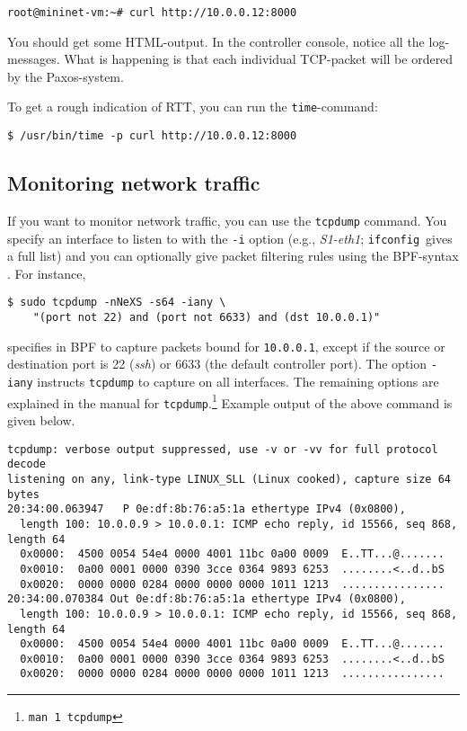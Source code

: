 \begin{Verbatim}
root@mininet-vm:~# curl http://10.0.0.12:8000
\end{Verbatim}

You should get some HTML-output.  In the controller console, notice
all the log-messages.  What is happening is that each individual
\acs{TCP}-packet will be ordered by the Paxos-system.

To get a rough indication of \acf{RTT}, you can run the \texttt{time}-command:

\begin{Verbatim}
$ /usr/bin/time -p curl http://10.0.0.12:8000
\end{Verbatim}

\subsection{Monitoring network traffic}
\label{chapter:tcpdump}

If you want to monitor network traffic, you can use the
\texttt{tcpdump}
command.  You specify an interface to listen to with the
\texttt{-i} option (e.g., \textit{S1-eth1};
\texttt{ifconfig} gives a full list) and you can
optionally give packet filtering rules using the
\acf{BPF}-syntax \cite{McCanne:1993:BPF:1267303.1267305}.  For instance,

\begin{Verbatim}
$ sudo tcpdump -nNeXS -s64 -iany \
    "(port not 22) and (port not 6633) and (dst 10.0.0.1)"
\end{Verbatim}

specifies in \acs{BPF} to capture packets bound for \texttt{10.0.0.1},
except if the source or destination port is 22
(\textit{ssh}) or 6633\index{controller!traffic
monitoring} (the default
controller port).  The option \texttt{-iany} instructs \texttt{tcpdump} to
capture on all interfaces.  The remaining options are explained in the
manual for \texttt{tcpdump}.\footnote{\texttt{man 1 tcpdump}}
Example output of the above command is given below.

\begin{Verbatim}[fontsize=\footnotesize]
tcpdump: verbose output suppressed, use -v or -vv for full protocol decode
listening on any, link-type LINUX_SLL (Linux cooked), capture size 64 bytes
20:34:00.063947   P 0e:df:8b:76:a5:1a ethertype IPv4 (0x0800), 
  length 100: 10.0.0.9 > 10.0.0.1: ICMP echo reply, id 15566, seq 868, length 64
  0x0000:  4500 0054 54e4 0000 4001 11bc 0a00 0009  E..TT...@.......
  0x0010:  0a00 0001 0000 0390 3cce 0364 9893 6253  ........<..d..bS
  0x0020:  0000 0000 0284 0000 0000 0000 1011 1213  ................
20:34:00.070384 Out 0e:df:8b:76:a5:1a ethertype IPv4 (0x0800), 
  length 100: 10.0.0.9 > 10.0.0.1: ICMP echo reply, id 15566, seq 868, length 64
  0x0000:  4500 0054 54e4 0000 4001 11bc 0a00 0009  E..TT...@.......
  0x0010:  0a00 0001 0000 0390 3cce 0364 9893 6253  ........<..d..bS
  0x0020:  0000 0000 0284 0000 0000 0000 1011 1213  ................
\end{Verbatim}

